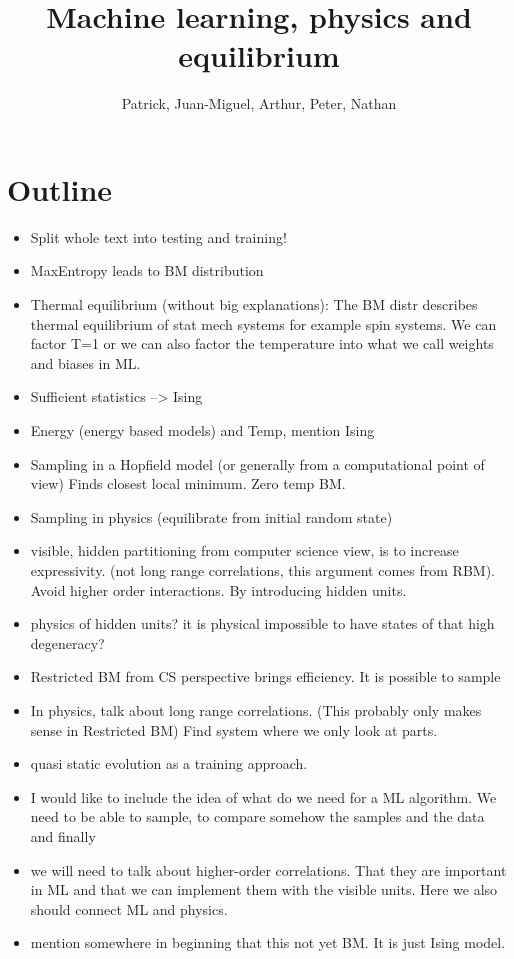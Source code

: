 \documentclass[nofootinbib, superscriptaddress, prl]{revtex4}
\begin{document}
\title{Machine learning, physics and equilibrium}
\author{Patrick, Juan-Miguel, Arthur, Peter, Nathan}
\maketitle

\section{Outline}

\begin{itemize}
\item Split whole text into testing and training!
\item MaxEntropy leads to BM distribution
\item Thermal equilibrium (without big explanations): The BM distr describes thermal equilibrium of stat mech systems for example spin systems.
We can factor T=1 or we can also factor the temperature into what we call weights and biases in ML.
\item Sufficient statistics --> Ising
\item Energy (energy based models) and Temp, mention Ising
\item Sampling in a Hopfield model (or generally from a computational point of view) Finds closest local minimum. Zero temp BM.
\item Sampling in physics (equilibrate from initial random state)
\item visible, hidden partitioning from computer science view, is to increase expressivity.
(not long range correlations, this argument comes from RBM). Avoid higher order interactions. By introducing hidden units.
\item physics of hidden units? it is physical impossible to have states of that high degeneracy?
\item Restricted BM from CS perspective brings efficiency. It is possible to sample
\item In physics, talk about long range correlations. (This probably only makes sense in Restricted BM)
Find system where we only look at parts.
\item quasi static evolution as a training approach.
\item I would like to include the idea of what do we need for a ML algorithm. We need to be able to sample, to compare somehow the samples and the data and finally 
\item we will need to talk about higher-order correlations. That they are important in ML and that we can implement them with the visible units. Here we also should connect ML and physics.
\item mention somewhere in beginning that this not yet BM. It is just Ising model.
\end{itemize}
\end{document}
